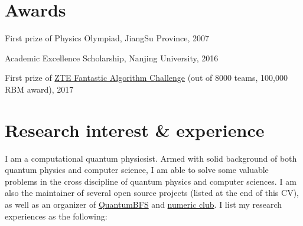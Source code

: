 \documentclass[letterpaper]{article}
\renewenvironment{itemize}{
  \begin{list}{}{
    \setlength{\leftmargin}{1.5em}
  }
}{
  \end{list}
}
\begin{document}
\section*{Awards}
\begin{itemize}
    \item First prize of Physics Olympiad, JiangSu Province, 2007
    \item Academic Excellence Scholarship, Nanjing University, 2016
    \item First prize of \href{http://www.iqiyi.com/w\_19rto3v4h1.html}{ZTE Fantastic Algorithm Challenge} (out of 8000 teams, 100,000 RBM award), 2017
\end{itemize}

\section*{Research interest \& experience}
I am a computational quantum physicsist. Armed with solid background of both quantum physics and computer science, I am able to solve some valuable problems in the cross discipline of quantum physics and computer sciences.
I am also the maintainer of several open source projects (listed at the end of this CV), as well as an organizer of \href{https://github.com/QuantumBFS/}{QuantumBFS} and \href{http://num.v2nobel.com}{numeric club}.
I list my research experiences as the following:
\end{document}
